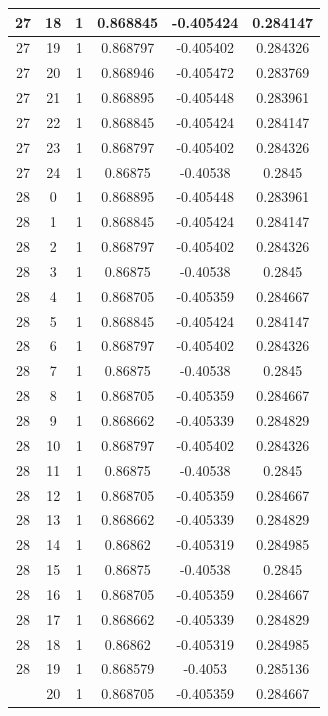 \documentclass[12pt,a4paper]{article}
\numberwithin{equation}{section}
\numberwithin{figure}{section}
\numberwithin{table}{section}
\begin{document}
\begin{longtable}{|c|c|c|c|c|c|}
27 & 18 & 1 & 0.868845 & -0.405424 & 0.284147 \\ \hline
27 & 19 & 1 & 0.868797 & -0.405402 & 0.284326 \\ \hline
27 & 20 & 1 & 0.868946 & -0.405472 & 0.283769 \\ \hline
27 & 21 & 1 & 0.868895 & -0.405448 & 0.283961 \\ \hline
27 & 22 & 1 & 0.868845 & -0.405424 & 0.284147 \\ \hline
27 & 23 & 1 & 0.868797 & -0.405402 & 0.284326 \\ \hline
27 & 24 & 1 & 0.86875 & -0.40538 & 0.2845 \\ \hline
28 & 0 & 1 & 0.868895 & -0.405448 & 0.283961 \\ \hline
28 & 1 & 1 & 0.868845 & -0.405424 & 0.284147 \\ \hline
28 & 2 & 1 & 0.868797 & -0.405402 & 0.284326 \\ \hline
28 & 3 & 1 & 0.86875 & -0.40538 & 0.2845 \\ \hline
28 & 4 & 1 & 0.868705 & -0.405359 & 0.284667 \\ \hline
28 & 5 & 1 & 0.868845 & -0.405424 & 0.284147 \\ \hline
28 & 6 & 1 & 0.868797 & -0.405402 & 0.284326 \\ \hline
28 & 7 & 1 & 0.86875 & -0.40538 & 0.2845 \\ \hline
28 & 8 & 1 & 0.868705 & -0.405359 & 0.284667 \\ \hline
28 & 9 & 1 & 0.868662 & -0.405339 & 0.284829 \\ \hline
28 & 10 & 1 & 0.868797 & -0.405402 & 0.284326 \\ \hline
28 & 11 & 1 & 0.86875 & -0.40538 & 0.2845 \\ \hline
28 & 12 & 1 & 0.868705 & -0.405359 & 0.284667 \\ \hline
28 & 13 & 1 & 0.868662 & -0.405339 & 0.284829 \\ \hline
28 & 14 & 1 & 0.86862 & -0.405319 & 0.284985 \\ \hline
28 & 15 & 1 & 0.86875 & -0.40538 & 0.2845 \\ \hline
28 & 16 & 1 & 0.868705 & -0.405359 & 0.284667 \\ \hline
28 & 17 & 1 & 0.868662 & -0.405339 & 0.284829 \\ \hline
28 & 18 & 1 & 0.86862 & -0.405319 & 0.284985 \\ \hline
28 & 19 & 1 & 0.868579 & -0.4053 & 0.285136 \\ \hline
\pagebreak
28 & 20 & 1 & 0.868705 & -0.405359 & 0.284667 \\ \hline

\end{longtable}
\end{document}
